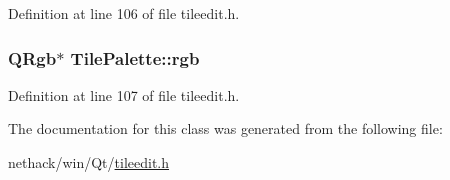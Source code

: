 Definition at line 106 of file tileedit.\+h.

\hypertarget{classTilePalette_ac0a6f2a8f16c9eb83862a89fce06b89e}{
\subsubsection[{rgb}]{\setlength{\rightskip}{0pt plus 5cm}Q\+Rgb$\ast$ Tile\+Palette\+::rgb\hspace{0.3cm}{\ttfamily [private]}}}\label{classTilePalette_ac0a6f2a8f16c9eb83862a89fce06b89e}


Definition at line 107 of file tileedit.\+h.



The documentation for this class was generated from the following file\+:\begin{DoxyCompactItemize}
\item 
nethack/win/\+Qt/\hyperlink{tileedit_8h}{tileedit.\+h}\end{DoxyCompactItemize}
